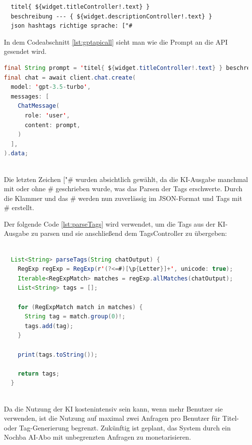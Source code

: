 \begin{verbatim}
  titel{ ${widget.titleController!.text} }
  beschreibung --- { ${widget.descriptionController!.text} }
  json hashtags richtige sprache: ["#
  \end{verbatim}


In dem Codeabschnitt \ref{lst:gptapicall} sieht man wie die Prompt an die API gesendet wird.
\begin{lstlisting}[language=Java,caption=OpenAI GPT-3.5-turbo API Call,label=lst:gptapicall]  
final String prompt = 'titel{ ${widget.titleController!.text} } beschreibung{ ${widget.descriptionController!.text} } json hashtags richtige sprache: ["#';
final chat = await client.chat.create(
  model: 'gpt-3.5-turbo',
  messages: [
    ChatMessage(
      role: 'user',
      content: prompt,
    )
  ],
).data;
      
\end{lstlisting}



Die letzten Zeichen ["\# wurden absichtlich gewählt, da die
KI-Ausgabe manchmal mit oder ohne \# geschrieben wurde, was
das Parsen der Tags erschwerte. Durch die Klammer und das \#
werden nun zuverlässig im JSON-Format und Tags mit \#
erstellt.

Der folgende Code \ref{lst:parseTags} wird verwendet, um die Tags aus der KI-Ausgabe zu parsen und sie anschließend dem TagsController zu übergeben:

\begin{lstlisting}[language=Java,caption=parseTags von 
  KI output,label=lst:parseTags]  
  
  List<String> parseTags(String chatOutput) {
    RegExp regExp = RegExp(r'(?<=#)[\p{Letter}]+', unicode: true);
    Iterable<RegExpMatch> matches = regExp.allMatches(chatOutput);
    List<String> tags = [];

    for (RegExpMatch match in matches) {
      String tag = match.group(0)!;
      tags.add(tag);
    }

    print(tags.toString());

    return tags;
  }
    
\end{lstlisting}


Da die Nutzung der KI kostenintensiv sein kann, wenn mehr Benutzer sie verwenden, ist die Nutzung auf maximal zwei Anfragen pro Benutzer für Titel- oder Tag-Generierung begrenzt. Zukünftig ist geplant, das System durch ein Nochba AI-Abo mit unbegrenzten Anfragen zu monetarisieren.


